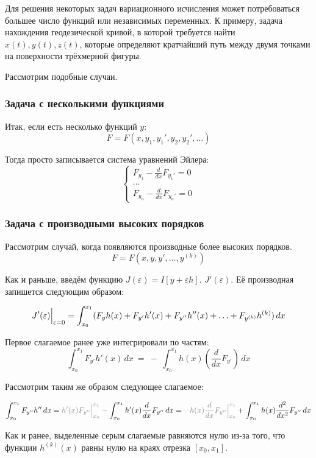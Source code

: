 \documentclass[12pt]{article}
\begin{document}
		Для решения некоторых задач вариационного исчисления может потребоваться большее число функций или
		независимых переменных. К примеру, задача нахождения геодезической кривой, в которой требуется найти
		$x(t), y(t), z(t)$, которые определяют кратчайший путь между двумя точками на поверхности трёхмерной
		фигуры.

		Рассмотрим подобные случаи.

		\subsubsection{Задача с несколькими функциями}

			Итак, если есть несколько функций $y$:
			$$F = F(x, y_1, y_1', y_2, y_2',\ldots)$$

			Тогда просто записывается система уравнений Эйлера:
			$$\left\{
			\begin{aligned}
				F_{y_1} - \frac{d}{dx}F_{y_1'} = 0 \\
				\dots\\
				F_{y_n} - \frac{d}{dx}F_{y_n'} = 0
			\end{aligned}
			\right.$$

		\subsubsection{Задача с производными высоких порядков}

			Рассмотрим случай, когда появляются производные более высоких порядков. 
			$$F = F(x, y, y', \ldots, y^{(k)})$$
			
			Как и раньше, введём функцию $J(\varepsilon) = I[y + \varepsilon h]$. $J'(\varepsilon)$. Её
			производная запишется следующим образом:

			$$J'(\varepsilon)\Big|_{\varepsilon = 0}^{} = \int_{x_0}^{x_1} (F_y h(x) + F_{y'}h'(x) 
			+ F_{y''}h''(x) + \ldots + F_{y^{(k)}}h^{(k)})\,dx$$

			Первое слагаемое ранее уже интегрировали по частям: 
			$$\int_{x_0}^{x_1} F_{y'}h'(x)\,dx~=~-~\int_{x_0}^{x_1} h(x)\left(\frac{d}{dx} F_{y'}\right)\,dx$$

			Рассмотрим таким же образом следующее слагаемое:

			$$\int_{x_0}^{x_1} F_{y''}h'' \,dx = \off{h'(x)F_{y''}\lims{x_0}{x_1}} - \int_{x_0}^{x_1} h'(x)\frac{d}{dx}F_{y''} \,dx
	  		= \off{-h(x)\frac{d}{dx} F_{y''}\lims{x_0}{x_1}} + \int_{x_0}^{x_1} h(x) \frac{d^2}{dx^2}F_{y''} \,dx$$

			Как и ранее, выделенные серым слагаемые равняются нулю из-за того, что функции $h^{(k)}(x)$ равны
			нулю на краях отрезка $[x_0, x_1]$.
\end{document}
